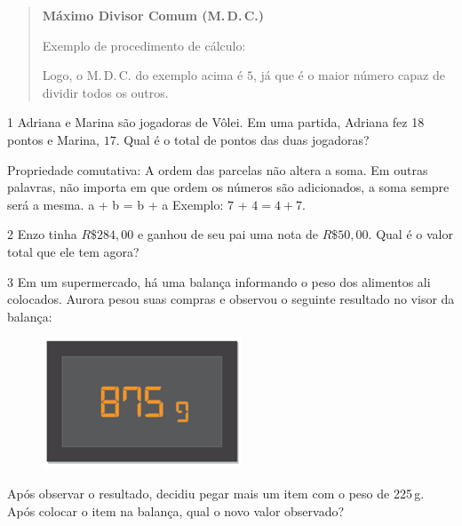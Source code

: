 \begin{quote}
\noindent\textbf{Máximo Divisor Comum (M.\,D.\,C.)}

\noindent Exemplo de procedimento de cálculo:


Logo, o M.\,D.\,C. do exemplo acima é $5$, já que é o maior número capaz de
dividir todos os outros.
\end{quote}


\num{1} Adriana e Marina são jogadoras de Vôlei. Em uma partida, Adriana fez
18 pontos e Marina, $17$. Qual é o total de pontos das duas jogadoras?



\noindent Propriedade comutativa: A ordem das parcelas não
altera a soma. Em outras palavras, não importa em que ordem os números
são adicionados, a soma sempre será a mesma. a + b = b + a Exemplo: $7$ +
$4 = 4 + 7$.

\num{2}  Enzo tinha $R\$284,00$ e ganhou de seu pai uma nota de $R\$50,00$. Qual é
o valor total que ele tem agora?


\num{3}  Em um supermercado, há uma balança informando o peso dos alimentos
ali colocados. Aurora pesou suas compras e observou o seguinte resultado
no visor da balança:

\begin{figure}
\centering\includegraphics[width=2.33333in,height=1.53125in]{./imgSAEB_6_MAT/media/image23.png}
\end{figure}

Após observar o resultado, decidiu pegar mais um item com o peso de
225\,g. Após colocar o item na balança, qual o novo valor observado?

